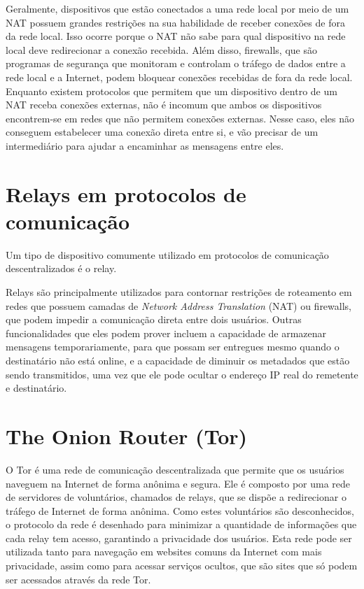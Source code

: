Geralmente, dispositivos que estão conectados a uma rede local por meio de um NAT possuem grandes restrições na sua habilidade de receber conexões de fora da rede local. Isso ocorre porque o NAT não sabe para qual dispositivo na rede local deve redirecionar a conexão recebida. Além disso, firewalls, que são programas de segurança que monitoram e controlam o tráfego de dados entre a rede local e a Internet, podem bloquear conexões recebidas de fora da rede local. Enquanto existem protocolos que permitem que um dispositivo dentro de um NAT receba conexões externas, não é incomum que ambos os dispositivos encontrem-se em redes que não permitem conexões externas. Nesse caso, eles não conseguem estabelecer uma conexão direta entre si, e vão precisar de um intermediário para ajudar a encaminhar as mensagens entre eles.

\section {Relays em protocolos de comunicação}

Um tipo de dispositivo comumente utilizado em protocolos de comunicação descentralizados é o relay.


Relays são principalmente utilizados para contornar restrições de roteamento em redes que possuem camadas de \textit{Network Address Translation} (NAT) ou firewalls, que podem impedir a comunicação direta entre dois usuários. Outras funcionalidades que eles podem prover incluem a capacidade de armazenar mensagens temporariamente, para que possam ser entregues mesmo quando o destinatário não está online, e a capacidade de diminuir os metadados que estão sendo transmitidos, uma vez que ele pode ocultar o endereço IP real do remetente e destinatário.

\section{The Onion Router (Tor)}

O Tor é uma rede de comunicação descentralizada que permite que os usuários naveguem na Internet de forma anônima e segura. Ele é composto por uma rede de servidores de voluntários, chamados de relays, que se dispõe a redirecionar o tráfego de Internet de forma anônima. Como estes voluntários são desconhecidos, o protocolo da rede é desenhado para minimizar a quantidade de informações que cada relay tem acesso, garantindo a privacidade dos usuários. Esta rede pode ser utilizada tanto para navegação em websites comuns da Internet com mais privacidade, assim como para acessar serviços ocultos, que são sites que só podem ser acessados através da rede Tor.

